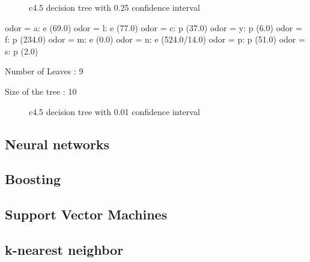 \documentclass{sig-alternate}
\begin{document}
\begin{figure}
    \centering
    \theverbbox
    \caption{c4.5 decision tree with 0.25 confidence interval \label{dt-c025}}
\end{figure}


\begin{verbbox}

odor = a: e (69.0)
odor = l: e (77.0)
odor = c: p (37.0)
odor = y: p (6.0)
odor = f: p (234.0)
odor = m: e (0.0)
odor = n: e (524.0/14.0)
odor = p: p (51.0)
odor = s: p (2.0)

Number of Leaves  :     9

Size of the tree :  10

\end{verbbox}

\begin{figure}
    \centering
    \theverbbox
    \caption{c4.5 decision tree with 0.01 confidence interval \label{dt-c001}}
\end{figure}

\subsection{Neural networks}



\subsection{Boosting}

\subsection{Support Vector Machines}

\subsection{k-nearest neighbor}
\end{document}
